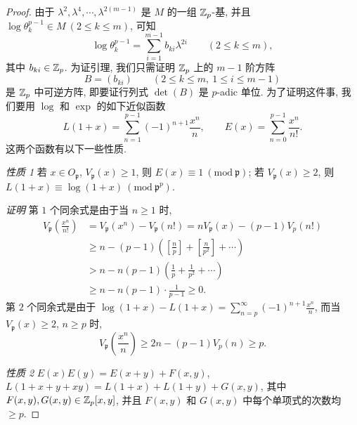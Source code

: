 \begin{proof}
由于 $\lambda^2,\lambda^4,\cdots,\lambda^{2(m-1)}$ 是 $M$ 的一组 $\mathbb{Z}_p$-基, 并且 $\log\theta_k^{p-1}\in M\ (2\leqslant k\leqslant m)$, 可知
\[
  \log\theta_k^{p-1}=\sum_{i=1}^{m-1}b_{ki}\lambda^{2i}\qquad(2\leqslant k\leqslant m),
\]
其中 $b_{ki}\in\mathbb{Z}_p$. 为证引理, 我们只需证明 $\mathbb{Z}_p$ 上的 $m-1$ 阶方阵
\[
  B=(b_{ki})\qquad(2\leqslant k\leqslant m,\ 1\leqslant i\leqslant m-1)
\]
是 $\mathbb{Z}_p$ 中可逆方阵, 即要证行列式 $\det(B)$ 是 $p$-adic 单位. 为了证明这件事, 我们要用 $\log$ 和 $\exp$ 的如下近似函数
\[
  L(1+x)=\sum_{n=1}^{p-1}(-1)^{n+1}\frac{x^n}{n},
  \qquad
  E(x)=\sum_{n=0}^{p-1}\frac{x^n}{n!}.
\]
这两个函数有以下一些性质.

\emph{性质 1} 若 $x\in O_{\mathfrak{p}}$, $V_{\mathfrak{p}}(x)\geqslant 1$, 则 $E(x)\equiv 1\ (\mathrm{mod}\ \mathfrak{p})$; 若 $V_{\mathfrak{p}}(x)\geqslant 2$, 则 $L(1+x)\equiv\log(1+x)\ (\mathrm{mod}\ \mathfrak{p}^p)$.

\emph{证明} 第 $1$ 个同余式是由于当 $n\geqslant 1$ 时,
\begin{align*}
  V_{\mathfrak{p}}\left(\frac{x^n}{n!}\right)&=V_{\mathfrak{p}}(x^n)-V_{\mathfrak{p}}(n!)
  =nV_{\mathfrak{p}}(x)-(p-1)V_p(n!)\\
  &\geqslant n-(p-1)\left(\left[\frac{n}{p}\right]+\left[\frac{n}{p^2}\right]+\cdots\right)\\
  &>n-n(p-1)\left(\frac{1}{p}+\frac{1}{p^2}+\cdots\right)\\
  &\geqslant n-n(p-1)\cdot\frac{1}{p-1}\geqslant 0.
\end{align*}
第 $2$ 个同余式是由于 $\log(1+x)-L(1+x)=\sum_{n=p}^{\infty}(-1)^{n+1}\frac{x^n}{n}$, 而当 $V_{\mathfrak{p}}(x)\geqslant 2$, $n\geqslant p$ 时,
\[
  V_{\mathfrak{p}}\left(\frac{x^n}{n}\right)\geqslant 2n-(p-1)V_p(n)\geqslant p.
\]

\emph{性质 2} $E(x)E(y)=E(x+y)+F(x,y)$, $L(1+x+y+xy)=L(1+x)+L(1+y)+G(x,y)$, 其中 $F(x,y),G(x,y)\in\mathbb{Z}_p[x,y]$, 并且 $F(x,y)$ 和 $G(x,y)$ 中每个单项式的次数均 $\geqslant p$.


\end{proof}
